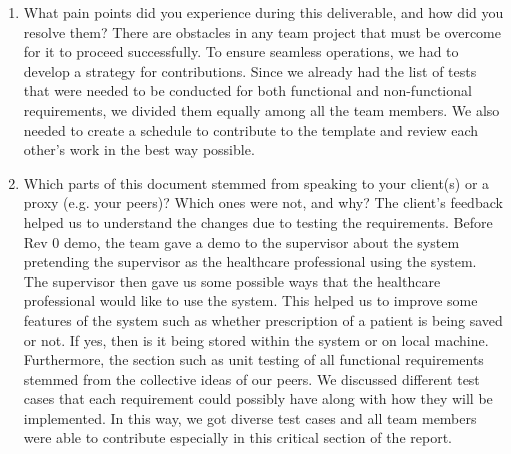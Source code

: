 \documentclass[12pt, titlepage]{article}
\begin{document}
\begin{enumerate}
\begin{enumerate}
\begin{enumerate}
\begin{enumerate}
\begin{enumerate}
\begin{enumerate}
\begin{enumerate}
\begin{enumerate}
\begin{enumerate}
\begin{enumerate}
  \item What pain points did you experience during this deliverable, and how did you resolve them?
  There are obstacles in any team project that must be overcome for it to proceed successfully. To ensure seamless operations, we had to develop a strategy for contributions. Since we already had the list of tests that were needed to be conducted for both functional and non-functional requirements, we divided them equally among all the team members. We also needed to create a schedule to contribute to the template and review each other's work in the best way possible. 

  \item Which parts of this document stemmed from speaking to your client(s) or a proxy (e.g. your peers)? Which ones were not, and why?
  The client's feedback helped us to understand the changes due to testing the requirements. Before Rev 0 demo, the team gave a demo to the supervisor about the system pretending the supervisor as the healthcare professional using the system. The supervisor then gave us some possible ways that the healthcare professional would like to use the system. This helped us to improve some features of the system such as whether prescription of a patient is being saved or not. If yes, then is it being stored within the system or on local machine. Furthermore, the section such as unit testing of all functional requirements stemmed from the collective ideas of our peers. We discussed different test cases that each requirement could possibly have along with how they will be implemented. In this way, we got diverse test cases and all team members were able to contribute especially in this critical section of the report.


\end{enumerate}
\end{enumerate}
\end{enumerate}
\end{enumerate}
\end{enumerate}
\end{enumerate}
\end{enumerate}
\end{enumerate}
\end{enumerate}
\end{enumerate}
\end{document}
